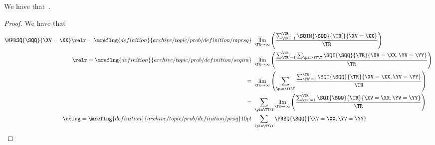 \begin{proposition}
  We have that\ \mprsqexprprop.%
\end{proposition}

\begin{proof}
  We have that
  \begin{align*}
  \MPRSQ{\SQQ}{\XV = \XX}
                    \relr = {\mreflng{definition}{archive/topic/prob/definition/mprsq}} \ & 
                    \lim_{\TR \rightarrow \infty}\left(\frac{\sum_{\TR' = 1}^{\TR}\SQIM{\SQQ}{\TR'}{\XV = \XX}}{\TR}\right)\\
                    \relr = {\mreflng{definition}{archive/topic/prob/definition/seqim}} \ & 
                    \lim_{\TR \rightarrow \infty}\left(\frac{\sum_{\TR' = 1}^{\TR}\sum_{\pin\YY\Y} \SQI{\SQQ}{\TR}{\XV = \XX, \YV = \YY}}{\TR}\right)\\
                    = \ & 
                    \lim_{\TR \rightarrow \infty}\left(\sum_{\pin\YY\Y} \frac{\sum_{\TR' = 1}^{\TR}\SQI{\SQQ}{\TR}{\XV = \XX, \YV = \YY}}{\TR}\right)\\
                    = \ & 
                    \sum_{\pin\YY\Y} \lim_{\TR \rightarrow \infty}\left(\frac{\sum_{\TR' = 1}^{\TR}\SQI{\SQQ}{\TR}{\XV = \XX, \YV = \YY}}{\TR}\right)\\
                    \relrg = {\mreflng{definition}{archive/topic/prob/definition/prsq}} 10pt \ & 
                    \sum_{\pin\YY\Y}\PRSQ{\SQQ}{\XV = \XX, \YV = \YY}
  \end{align*}
\end{proof}
